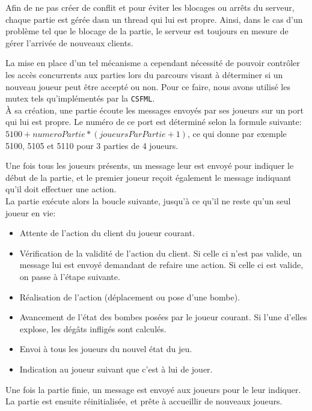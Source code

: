 Afin de ne pas créer de conflit et pour éviter les blocages ou arrêts du serveur, chaque partie est gérée dasn un thread qui lui est propre. Ainsi, dans le cas d'un problème tel que le blocage de la partie, le serveur est toujours en mesure de gérer l'arrivée de nouveaux clients.

La mise en place d'un tel mécanisme a cependant nécessité de pouvoir contrôler les accès concurrents aux parties lors du parcours visant à déterminer si un nouveau joueur peut être accepté ou non. Pour ce faire, nous avons utilisé les mutex tels qu'implémentés par la \texttt{CSFML}.\\

\`A sa création, une partie écoute les messages envoyés par ses joueurs sur un port qui lui est propre. Le numéro de ce port est déterminé selon la formule suivante: \(5100+numeroPartie*(joueursParPartie+1)\), ce qui donne par exemple 5100, 5105 et 5110 pour 3 parties de 4 joueurs.

Une fois tous les joueurs présents, un message leur est envoyé pour indiquer le début de la partie, et le premier joueur reçoit également le message indiquant qu'il doit effectuer une action.\\

La partie exécute alors la boucle suivante, jusqu'à ce qu'il ne reste qu'un seul joueur en vie:
\begin{itemize}
	\item Attente de l'action du client du joueur courant.
    \item Vérification de la validité de l'action du client. Si celle ci n'est pas valide, un message lui est envoyé demandant de refaire une action. Si celle ci est valide, on passe à l'étape suivante.
    \item Réalisation de l'action (déplacement ou pose d'une bombe).
    \item Avancement de l'état des bombes posées par le joueur courant. Si l'une d'elles explose, les dégâts infligés sont calculés.
    \item Envoi à tous les joueurs du nouvel état du jeu.
    \item Indication au joueur suivant que c'est à lui de jouer.\\
\end{itemize}

Une fois la partie finie, un message est envoyé aux joueurs pour le leur indiquer. La partie est ensuite réinitialisée, et prête à accueillir de nouveaux joueurs.

